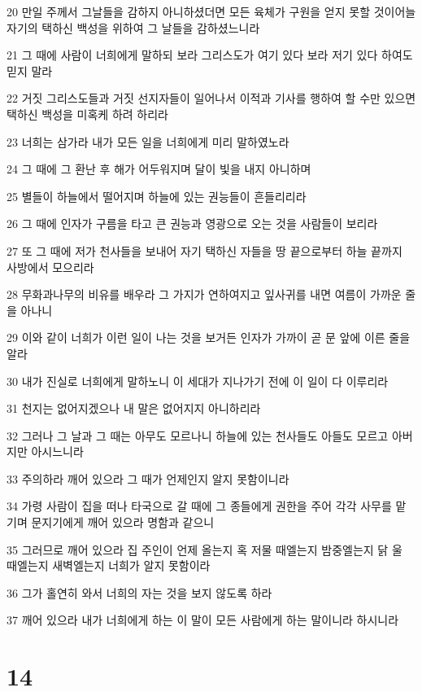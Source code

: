 \par 20 만일 주께서 그날들을 감하지 아니하셨더면 모든 육체가 구원을 얻지 못할 것이어늘 자기의 택하신 백성을 위하여 그 날들을 감하셨느니라
\par 21 그 때에 사람이 너희에게 말하되 보라 그리스도가 여기 있다 보라 저기 있다 하여도 믿지 말라
\par 22 거짓 그리스도들과 거짓 선지자들이 일어나서 이적과 기사를 행하여 할 수만 있으면 택하신 백성을 미혹케 하려 하리라
\par 23 너희는 삼가라 내가 모든 일을 너희에게 미리 말하였노라
\par 24 그 때에 그 환난 후 해가 어두워지며 달이 빛을 내지 아니하며
\par 25 별들이 하늘에서 떨어지며 하늘에 있는 권능들이 흔들리리라
\par 26 그 때에 인자가 구름을 타고 큰 권능과 영광으로 오는 것을 사람들이 보리라
\par 27 또 그 때에 저가 천사들을 보내어 자기 택하신 자들을 땅 끝으로부터 하늘 끝까지 사방에서 모으리라
\par 28 무화과나무의 비유를 배우라 그 가지가 연하여지고 잎사귀를 내면 여름이 가까운 줄을 아나니
\par 29 이와 같이 너희가 이런 일이 나는 것을 보거든 인자가 가까이 곧 문 앞에 이른 줄을 알라
\par 30 내가 진실로 너희에게 말하노니 이 세대가 지나가기 전에 이 일이 다 이루리라
\par 31 천지는 없어지겠으나 내 말은 없어지지 아니하리라
\par 32 그러나 그 날과 그 때는 아무도 모르나니 하늘에 있는 천사들도 아들도 모르고 아버지만 아시느니라
\par 33 주의하라 깨어 있으라 그 때가 언제인지 알지 못함이니라
\par 34 가령 사람이 집을 떠나 타국으로 갈 때에 그 종들에게 권한을 주어 각각 사무를 맡기며 문지기에게 깨어 있으라 명함과 같으니
\par 35 그러므로 깨어 있으라 집 주인이 언제 올는지 혹 저물 때엘는지 밤중엘는지 닭 울 때엘는지 새벽엘는지 너희가 알지 못함이라
\par 36 그가 홀연히 와서 너희의 자는 것을 보지 않도록 하라
\par 37 깨어 있으라 내가 너희에게 하는 이 말이 모든 사람에게 하는 말이니라 하시니라

\chapter{14}

